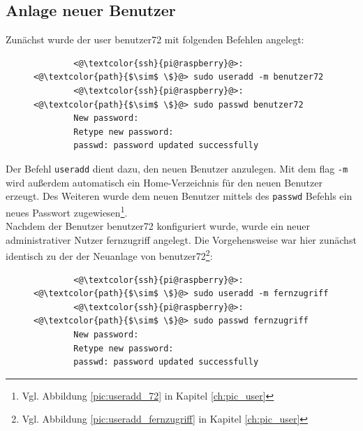 \documentclass[a4paper, 11pt]{scrartcl}
\begin{document}
\subsection{Anlage neuer Benutzer}\label{ch:user_add}
Zunächst wurde der user \glqq benutzer72\grqq{} mit folgenden Befehlen angelegt:
\begin{figure}[H]
    \begin{mdframed}[backgroundcolor=bbg]
        \begin{lstlisting}
        <@\textcolor{ssh}{pi@raspberry}@>:<@\textcolor{path}{$\sim$ \$}@> sudo useradd -m benutzer72
        <@\textcolor{ssh}{pi@raspberry}@>:<@\textcolor{path}{$\sim$ \$}@> sudo passwd benutzer72
        New password:
        Retype new password:
        passwd: password updated successfully
        \end{lstlisting}
    \end{mdframed}
    \label{lst:user_72}
\end{figure}
Der Befehl \lstinline[basicstyle={\small\ttfamily\color{black}}]|useradd| dient dazu, den neuen Benutzer anzulegen. Mit dem flag \lstinline[basicstyle={\small\ttfamily\color{black}}]|-m| wird außerdem
automatisch ein Home-Verzeichnis für den neuen Benutzer erzeugt. Des Weiteren wurde dem neuen Benutzer mittels des \lstinline[basicstyle={\small\ttfamily\color{black}}]|passwd| Befehls ein neues Passwort
zugewiesen\footnote{Vgl. Abbildung \ref{pic:useradd_72} in Kapitel \ref{ch:pic_user}}.
\\
Nachdem der Benutzer benutzer72 konfiguriert wurde, wurde ein neuer administrativer Nutzer \glqq fernzugriff\grqq{} angelegt. Die Vorgehensweise war hier zunächst identisch zu der der Neuanlage von
benutzer72\footnote{Vgl. Abbildung \ref{pic:useradd_fernzugriff} in Kapitel \ref{ch:pic_user}}:
\begin{figure}[H]
    \begin{mdframed}[backgroundcolor=bbg]
        \begin{lstlisting}
        <@\textcolor{ssh}{pi@raspberry}@>:<@\textcolor{path}{$\sim$ \$}@> sudo useradd -m fernzugriff
        <@\textcolor{ssh}{pi@raspberry}@>:<@\textcolor{path}{$\sim$ \$}@> sudo passwd fernzugriff
        New password:
        Retype new password:
        passwd: password updated successfully
        \end{lstlisting}
    \end{mdframed}
    \label{lst:user_fernzugriff}
\end{figure}
\end{document}
